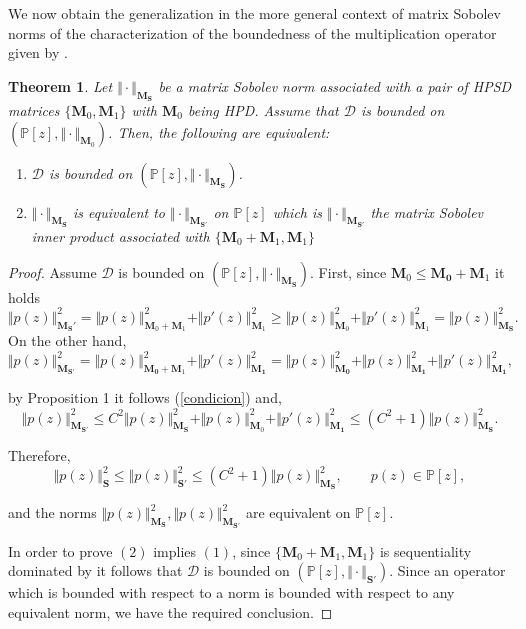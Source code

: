 \documentclass[12pt]{amsart}
\theoremstyle{definition}
\theoremstyle{plain}
\newtheorem{theorem}{Theorem}
\theoremstyle{remark}
\begin{document}
\noindent We now obtain the generalization in the more general context of matrix Sobolev norms of the characterization of the boundedness of the multiplication operator given by \cite{JR3}.

 
\begin{theorem} Let $\Vert \cdot \Vert_{\mathbf{M_S}}$ be a matrix Sobolev norm associated with a pair of HPSD matrices  $\{\mathbf{M}_0,\mathbf{M}_1\}$  with $\mathbf{M}_0$ being HPD. Assume that $\mathcal{D}$ is bounded on 
$(\mathbb{P}[z],\Vert \cdot \Vert_{\mathbf{M}_0})$. Then, the following are equivalent: 
\begin{enumerate}
\item $\mathcal{D}$ is bounded on $(\mathbb{P}[z], \Vert \cdot \Vert_{\mathbf{M_S}})$.
\item $\Vert \cdot \Vert_{\mathbf{M_S}}$ is equivalent to $\Vert \cdot \Vert_{\mathbf{M_{S'}}}$ on $\mathbb{P}[z]$ which is $\Vert \cdot \Vert_{\mathbf{M_{S'}}}$ the matrix Sobolev inner product associated with $\{\mathbf{M}_0+\mathbf{M}_1,\mathbf{M}_1\}$
\end{enumerate}
\end{theorem}

\begin{proof} Assume $\mathcal{D}$ is bounded on $(\mathbb{P}[z], \Vert \cdot \Vert_{\mathbf{M_S}})$.  First, since $\mathbf{M}_0 \leq \mathbf{M_0}+\mathbf{M}_1$ it holds 
$$
\Vert p(z) \Vert^{2}_{\mathbf{M_S'}}= \Vert p(z) \Vert^{2}_{\mathbf{M}_0+\mathbf{M}_1}+ \Vert p'(z) \Vert^{2}_{\mathbf{M}_1} \geq 
\Vert p(z) \Vert^{2}_{\mathbf{M}_0}+ \Vert p'(z) \Vert^{2}_{\mathbf{M}_1} = \Vert p(z) \Vert^{2}_{\mathbf{M_{S}}}.
$$
\noindent On the other hand, 
$$
\Vert p(z) \Vert^{2}_{\mathbf{M_{S'}}}= \Vert p(z)\Vert^{2}_{{\mathbf{M_0}+\mathbf{M}_1}}+ \Vert p'(z) \Vert^{2}_{\mathbf{M_1}} = \Vert p(z) \Vert^{2}_{\mathbf{M_0}}+\Vert p(z) \Vert^{2}_{\mathbf{M_1}}+ \Vert p'(z) \Vert^{2}_{\mathbf{M_1}}, 
$$

\noindent by Proposition 1 it follows (\ref{condicion})  and, 
$$
\Vert p(z) \Vert^{2}_{\mathbf{M_{S'}}}\leq    C^2\Vert p(z) \Vert^{2}_{\mathbf{M_S}}+ \Vert p(z) \Vert^{2}_{\mathbf{M}_0} +  \Vert p'(z) \Vert^{2}_{\mathbf{M_1}}
 \leq (C^2+1)\Vert p(z) \Vert^{2}_{\mathbf{M_S}}.
$$

\noindent Therefore, 
$$
\Vert p(z) \Vert^{2}_{\mathbf{S}}
\leq \Vert p(z) \Vert^{2}_{\mathbf{S'}}
\leq (C^2+1)\Vert p(z) \Vert^{2}_{\mathbf{M_S}}, \qquad p(z) \in \mathbb{P}[z],
$$

\noindent and the norms  $\Vert p(z) \Vert^{2}_{\mathbf{M_{S}}},  \Vert p(z) \Vert^{2}_{\mathbf{M_{S'}}}$ are equivalent on $\mathbb{P}[z]$. 

\noindent In order to prove $(2)$ implies $(1)$, since $\{\mathbf{M}_0+\mathbf{M}_1, \mathbf{M}_1\}$ is sequentiality dominated by \cite{EG23} it follows that $\mathcal{D}$ is bounded on $(\mathbb{P}[z], \Vert \cdot \Vert_{\mathbf{S'}})$.  
Since an operator which is bounded with respect to a norm is bounded with respect to any equivalent norm, we have the required conclusion.

\end{proof}
\end{document}
